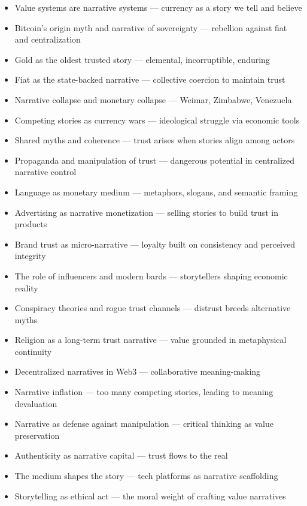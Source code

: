 \documentclass[11pt,oneside]{book}
\begin{document}
\begin{itemize}
\item Value systems are narrative systems — currency as a story we tell and believe
\item Bitcoin's origin myth and narrative of sovereignty — rebellion against fiat and centralization
\item Gold as the oldest trusted story — elemental, incorruptible, enduring
\item Fiat as the state-backed narrative — collective coercion to maintain trust
\item Narrative collapse and monetary collapse — Weimar, Zimbabwe, Venezuela
\item Competing stories as currency wars — ideological struggle via economic tools
\item Shared myths and coherence — trust arises when stories align among actors
\item Propaganda and manipulation of trust — dangerous potential in centralized narrative control
\item Language as monetary medium — metaphors, slogans, and semantic framing
\item Advertising as narrative monetization — selling stories to build trust in products
\item Brand trust as micro-narrative — loyalty built on consistency and perceived integrity
\item The role of influencers and modern bards — storytellers shaping economic reality
\item Conspiracy theories and rogue trust channels — distrust breeds alternative myths
\item Religion as a long-term trust narrative — value grounded in metaphysical continuity
\item Decentralized narratives in Web3 — collaborative meaning-making
\item Narrative inflation — too many competing stories, leading to meaning devaluation
\item Narrative as defense against manipulation — critical thinking as value preservation
\item Authenticity as narrative capital — trust flows to the real
\item The medium shapes the story — tech platforms as narrative scaffolding
\item Storytelling as ethical act — the moral weight of crafting value narratives
\end{itemize}
\end{document}
